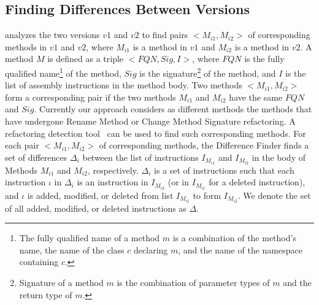 \subsection{Finding Differences Between Versions}
\vspace{-1.5ex}
 analyzes the two versions $v1$ and $v2$ to find pairs $<$$M_{i1}, M_{i2}$$>$ of corresponding methods in $v1$ and $v2$, where $M_{i1}$ is a method in $v1$ and $M_{i2}$ is a method in $v2$. A method $M$ is defined as a triple $<$$FQN, Sig, I$$>$, where $FQN$ is the fully qualified name\footnote{\scriptsize{The fully qualified name of a method $m$ is a combination of the method's name, the name of the class $c$ declaring $m$, and the name of the namespace containing $c$.}} of the method, $Sig$ is the signature\footnote{\scriptsize{Signature of a method $m$ is the combination of parameter types of $m$ and the return type of $m$.}} of the method, and $I$ is the list of assembly instructions in the method body. Two methods $<$$M_{i1}, M_{i2}$$>$ form a  corresponding pair if the two methods $M_{i1}$ and $M_{i2}$ have the same $FQN$ and $Sig$. Currently our approach considers as different methods the methods that have undergone Rename Method or Change Method Signature refactoring. A refactoring detection tool~\cite{Dig'06:ECOOP} can be used to find such corresponding methods. For each pair $<$$M_{i1}, M_{i2}$$>$ of corresponding methods, the Difference Finder finds a set of  differences $\Delta_i$ between the list of instructions $I_{M_{i1}}$ and $I_{M_{i2}}$ in the body of Methods $M_{i1}$ and $M_{i2}$, respectively. $\Delta_i$ is a set of instructions such that each instruction $\iota$ in $\Delta_i$ is an instruction in $I_{M_{i2}}$ (or in $I_{M_{i1}}$ for a deleted instruction), and $\iota$ is added, modified, or deleted from list $I_{M_{i1}}$ to form $I_{M_{i2}}$. 
We denote the set of all added, modified, or deleted instructions as $\Delta$. 
%   
